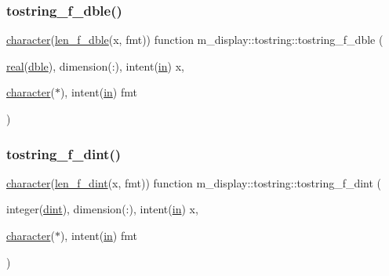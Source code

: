 \subsubsection{\texorpdfstring{tostring\+\_\+f\+\_\+dble()}{tostring\_f\_dble()}}
{\footnotesize\ttfamily \hyperlink{option__stopwatch_83_8txt_abd4b21fbbd175834027b5224bfe97e66}{character}(\hyperlink{namespacem__display_aa013a639d5b0f7e40b627c9d712693f0}{len\+\_\+f\+\_\+dble}(x, fmt)) function m\+\_\+display\+::tostring\+::tostring\+\_\+f\+\_\+dble (\begin{DoxyParamCaption}\item[{\hyperlink{read__watch_83_8txt_abdb62bde002f38ef75f810d3a905a823}{real}(\hyperlink{namespacem__display_a46d90b75b6ccef7ccade133e5847e815}{dble}), dimension(\+:), intent(\hyperlink{M__journal_83_8txt_afce72651d1eed785a2132bee863b2f38}{in})}]{x,  }\item[{\hyperlink{option__stopwatch_83_8txt_abd4b21fbbd175834027b5224bfe97e66}{character}($\ast$), intent(\hyperlink{M__journal_83_8txt_afce72651d1eed785a2132bee863b2f38}{in})}]{fmt }\end{DoxyParamCaption})\hspace{0.3cm}{\ttfamily [private]}}

\mbox{\label{interfacem__display_1_1tostring_aeeab66dd4067f9327d18db4a47655977}} 
\subsubsection{\texorpdfstring{tostring\+\_\+f\+\_\+dint()}{tostring\_f\_dint()}}
{\footnotesize\ttfamily \hyperlink{option__stopwatch_83_8txt_abd4b21fbbd175834027b5224bfe97e66}{character}(\hyperlink{namespacem__display_a6a2709cf5f243ee492f223b40c6b5143}{len\+\_\+f\+\_\+dint}(x, fmt)) function m\+\_\+display\+::tostring\+::tostring\+\_\+f\+\_\+dint (\begin{DoxyParamCaption}\item[{integer(\hyperlink{namespacem__display_a73f772e9702cad6f40b78364fde2c7cd}{dint}), dimension(\+:), intent(\hyperlink{M__journal_83_8txt_afce72651d1eed785a2132bee863b2f38}{in})}]{x,  }\item[{\hyperlink{option__stopwatch_83_8txt_abd4b21fbbd175834027b5224bfe97e66}{character}($\ast$), intent(\hyperlink{M__journal_83_8txt_afce72651d1eed785a2132bee863b2f38}{in})}]{fmt }\end{DoxyParamCaption})\hspace{0.3cm}{\ttfamily [private]}}

